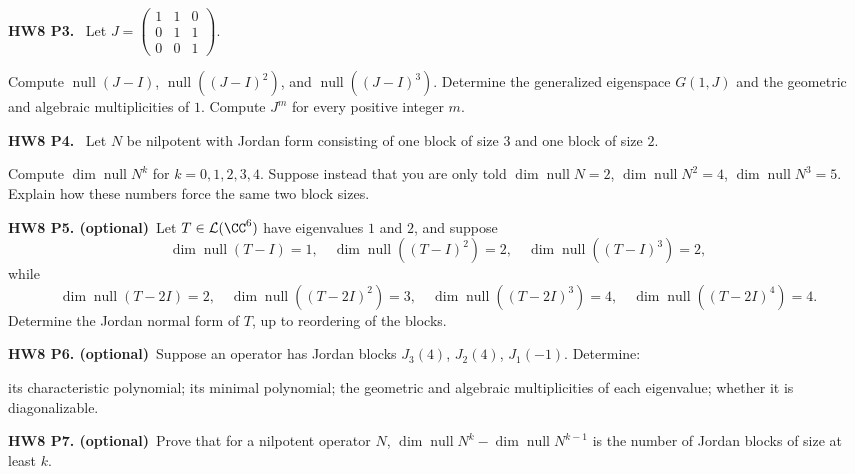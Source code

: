 \documentclass[10pt]{scrartcl}
\DeclareMathOperator{\nul}{null}
\newcommand{\LL}{\mathcal L}
\newenvironment{prob}{\par\bigskip\noindent\begin{minipage}{\linewidth}\setlength{\parskip}{4pt}}{\end{minipage}\par}
\begin{document}
\begin{prob}
\textbf{HW8 P3. }\ Let $J=\begin{pmatrix}1&1&0\\0&1&1\\0&0&1\end{pmatrix}$.
\begin{enumerate}[(a)]
  \ii Compute $\nul(J-I)$, $\nul((J-I)^2)$, and $\nul((J-I)^3)$.
  \ii Determine the generalized eigenspace $G(1,J)$ and the geometric and algebraic multiplicities of $1$.
  \ii Compute $J^m$ for every positive integer $m$.
\end{enumerate}
\end{prob}

\begin{prob}
\textbf{HW8 P4. }\ Let $N$ be nilpotent with Jordan form consisting of one block of size $3$ and one block of size $2$.
\begin{enumerate}[(a)]
  \ii Compute $\dim\nul N^k$ for $k=0,1,2,3,4$.
  \ii Suppose instead that you are only told $\dim\nul N=2$, $\dim\nul N^2=4$, $\dim\nul N^3=5$. Explain how these numbers force the same two block sizes.
\end{enumerate}
\end{prob}

\begin{prob}
\textbf{HW8 P5. (optional)}\ Let $T\in\LL(\CC^6)$ have eigenvalues $1$ and $2$, and suppose
\[ \dim\nul(T-I)=1,\quad\dim\nul((T-I)^2)=2,\quad\dim\nul((T-I)^3)=2, \]
while
\[ \dim\nul(T-2I)=2,\quad\dim\nul((T-2I)^2)=3,\quad\dim\nul((T-2I)^3)=4,\quad\dim\nul((T-2I)^4)=4. \]
Determine the Jordan normal form of $T$, up to reordering of the blocks.
\end{prob}

\begin{prob}
\textbf{HW8 P6. (optional)}\ Suppose an operator has Jordan blocks $J_3(4)$, $J_2(4)$, $J_1(-1)$. Determine:
\begin{enumerate}[(a)]
  \ii its characteristic polynomial;
  \ii its minimal polynomial;
  \ii the geometric and algebraic multiplicities of each eigenvalue;
  \ii whether it is diagonalizable.
\end{enumerate}
\end{prob}

\begin{prob}
\textbf{HW8 P7. (optional)}\ Prove that for a nilpotent operator $N$, $\dim\nul N^k-\dim\nul N^{k-1}$ is the number of Jordan blocks of size at least $k$.
\end{prob}
\end{document}
